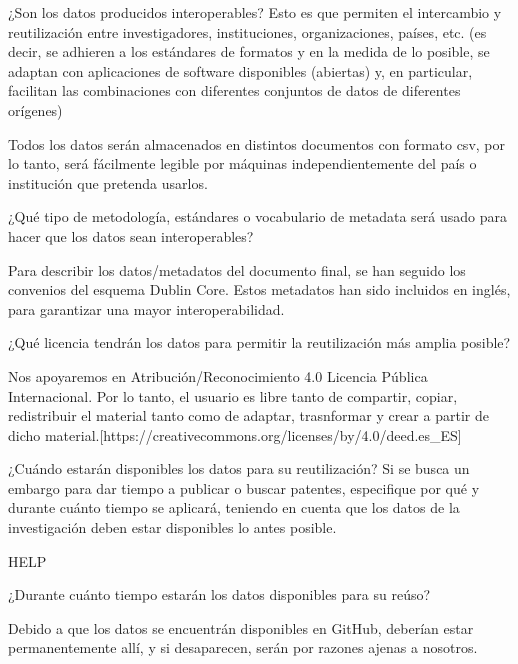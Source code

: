 \documentclass[12pt, spanish]{article}
\begin{document}
\begin{shaded}
¿Son los datos producidos interoperables? Esto es que permiten el intercambio y reutilización entre investigadores, instituciones, organizaciones, países, etc. (es decir, se adhieren a los estándares de formatos y en la medida de lo posible, se adaptan con aplicaciones de software disponibles (abiertas) y, en particular, facilitan las combinaciones con diferentes conjuntos de datos de diferentes orígenes)
\end{shaded}
Todos los datos serán almacenados en distintos documentos con formato csv, por lo tanto, será fácilmente legible por máquinas independientemente del país o institución que pretenda usarlos.\\


\begin{shaded}
¿Qué tipo de metodología, estándares o vocabulario de metadata será usado para hacer que los datos sean interoperables?
\end{shaded}
Para describir los datos/metadatos del documento final, se han seguido los convenios del esquema Dublin Core. Estos metadatos han sido incluidos en inglés, para garantizar una mayor interoperabilidad.\\



\begin{shaded}
¿Qué licencia tendrán los datos para permitir la reutilización más amplia posible?
\end{shaded}
Nos apoyaremos en Atribución/Reconocimiento 4.0 Licencia Pública Internacional. Por lo tanto, el usuario es libre tanto de compartir, copiar, redistribuir el material tanto como de adaptar, trasnformar y crear a partir de dicho material.[https://creativecommons.org/licenses/by/4.0/deed.es_ES]\\


\begin{shaded}
¿Cuándo estarán disponibles los datos para su reutilización? Si se busca un embargo para dar tiempo a publicar o buscar patentes, especifique por qué y durante cuánto tiempo se aplicará, teniendo en cuenta que los datos de la investigación deben estar disponibles lo antes posible.
\end{shaded}
HELP\\

\begin{shaded}
¿Durante cuánto tiempo estarán los datos disponibles para su reúso?
\end{shaded}
Debido a que los datos se encuentrán disponibles en GitHub, deberían estar permanentemente allí, y si desaparecen, serán por razones ajenas a nosotros.
\end{document}
